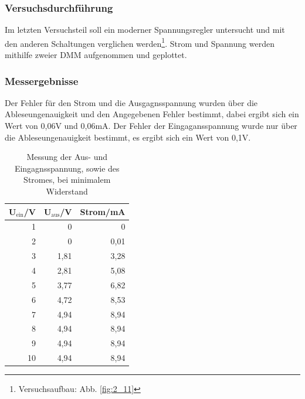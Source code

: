\documentclass[12pt,a4paper]{article}
\begin{document}
\subsubsection{Versuchsdurchführung}
Im letzten Versuchsteil soll ein moderner Spannungsregler untersucht und mit den anderen Schaltungen verglichen werden\footnote{Versuchsaufbau: Abb. \ref{fig:2_11}}. Strom und Spannung werden mithilfe zweier DMM aufgenommen und geplottet.
\subsubsection{Messergebnisse}

Der Fehler für den Strom und die Ausgagnsspannung wurden über die Ableseungenauigkeit und den Angegebenen Fehler bestimmt, dabei ergibt sich ein Wert von 0,06V und 0,06mA. Der Fehler der Eingagansspannung wurde nur über die Ableseungenauigkeit bestimmt, es ergibt sich ein Wert von 0,1V.

\begin{table}[H]
\caption{Messung der Aus- und Eingagnsspannung, sowie des Stromes, bei minimalem Widerstand}
\begin{center}
\begin{tabular}{|r|r|r|}
\hline
\multicolumn{1}{|l|}{U$_\text{ein}$/V} & \multicolumn{1}{l|}{U$_\text{aus}$/V} & \multicolumn{1}{l|}{Strom/mA} \\ \hline
1 & 0 & 0 \\ \hline
2 & 0 & 0,01 \\ \hline
3 & 1,81 & 3,28 \\ \hline
4 & 2,81 & 5,08 \\ \hline
5 & 3,77 & 6,82 \\ \hline
6 & 4,72 & 8,53 \\ \hline
7 & 4,94 & 8,94 \\ \hline
8 & 4,94 & 8,94 \\ \hline
9 & 4,94 & 8,94 \\ \hline
10 & 4,94 & 8,94 \\ \hline
\end{tabular}
\end{center}
\label{tab:3_4_min}
\end{table}
\end{document}
